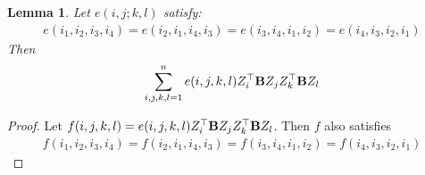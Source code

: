 \documentclass[11pt]{article}
\theoremstyle{plain}
\newtheorem{lemma}{\quad\quad Lemma}
\theoremstyle{definition}
\theoremstyle{remark}
\begin{document}
\begin{lemma}
    Let $e(i,j;k,l)$ satisfy:
    \begin{equation*}
        \begin{split}
            e(i_1,i_2,i_3,i_4)
            =
            e(i_2,i_1,i_4,i_3)
            =
            e(i_3,i_4,i_1,i_2)
            =
            e(i_4,i_3,i_2,i_1)
        \end{split}
    \end{equation*}
    Then
    \begin{equation*}
        \sum_{i,j,k,l=1}^n e(i,j,k,l) Z_i^\top \mathbf{B} Z_j Z_k^\top \mathbf{B} Z_l
    \end{equation*}
\end{lemma}
\begin{proof}
    Let $f(i,j,k,l)= e(i,j,k,l)Z_i^\top \mathbf{B} Z_j Z_k^\top \mathbf{B} Z_l
    $.
    Then $f$ also satisfies
    \begin{equation*}
        \begin{split}
            f(i_1,i_2,i_3,i_4)
            =
            f(i_2,i_1,i_4,i_3)
            =
            f(i_3,i_4,i_1,i_2)
            =
            f(i_4,i_3,i_2,i_1)
        \end{split}
    \end{equation*}


\end{proof}
\end{document}
